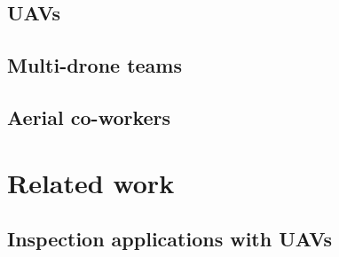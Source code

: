 

\subsection{UAVs}
\label{subsec:UAVs}

\subsection{Multi-drone teams}
\label{subsec:Multi-droneTeams}

\subsection{Aerial co-workers}
\label{subsec:AerialCo-workers}

\section{Related work}
\label{sec:RelatedWork}

\subsection{Inspection applications with UAVs}
\label{subsec:InspectionApplicationsWithUAVs}

